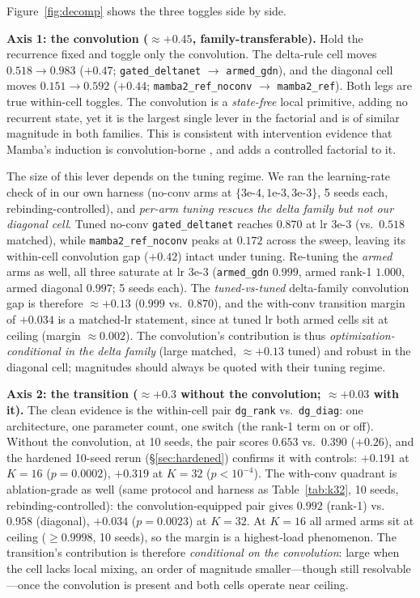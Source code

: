 \documentclass{article}
\newcommand{\armed}{\texttt{armed\_gdn}}
\newcommand{\gdn}{\texttt{gated\_deltanet}}
\newcommand{\dgrank}{\texttt{dg\_rank}}
\newcommand{\dgdiag}{\texttt{dg\_diag}}
\newcommand{\mambaref}{\texttt{mamba2\_ref}}
\newcommand{\mambanoconv}{\texttt{mamba2\_ref\_noconv}}
\begin{document}
Figure~\ref{fig:decomp} shows the three toggles side by side.

\textbf{Axis 1: the convolution ($\approx{+}0.45$, family-transferable).} Hold the recurrence fixed and toggle only the convolution. The delta-rule cell moves $0.518 \to 0.983$ ($+0.47$; \gdn{} $\to$ \armed{}), and the diagonal cell moves $0.151 \to 0.592$ ($+0.44$; \mambanoconv{} $\to$ \mambaref{}). Both legs are true within-cell toggles. The convolution is a \emph{state-free} local primitive, adding no recurrent state, yet it is the largest single lever in the factorial and is of similar magnitude in both families. This is consistent with intervention evidence that Mamba's induction is convolution-borne \citep{arora2025convs,parnichkun2025ess}, and adds a controlled factorial to it.

The size of this lever depends on the tuning regime. We ran the learning-rate check of \citet{okpekpe2025recall} in our own harness (no-conv arms at $\{3\text{e-}4, 1\text{e-}3, 3\text{e-}3\}$, 5 seeds each, rebinding-controlled), and \emph{per-arm tuning rescues the delta family but not our diagonal cell}. Tuned no-conv \gdn{} reaches $0.870$ at lr $3$e-$3$ (vs.\ $0.518$ matched), while \mambanoconv{} peaks at $0.172$ across the sweep, leaving its within-cell convolution gap (${+}0.42$) intact under tuning. Re-tuning the \emph{armed} arms as well, all three saturate at lr $3$e-$3$ (\armed{} $0.999$, armed rank-1 $1.000$, armed diagonal $0.997$; 5 seeds each). The \emph{tuned-vs-tuned} delta-family convolution gap is therefore ${\approx}{+}0.13$ ($0.999$ vs.\ $0.870$), and the with-conv transition margin of ${+}0.034$ is a matched-lr statement, since at tuned lr both armed cells sit at ceiling (margin ${\approx}0.002$). The convolution's contribution is thus \emph{optimization-conditional in the delta family} (large matched, ${\approx}{+}0.13$ tuned) and robust in the diagonal cell; magnitudes should always be quoted with their tuning regime.

\textbf{Axis 2: the transition ($\approx{+}0.3$ without the convolution; $\approx{+}0.03$ with it).} The clean evidence is the within-cell pair \dgrank{} vs.\ \dgdiag{}: one architecture, one parameter count, one switch (the rank-1 term on or off). Without the convolution, at 10 seeds, the pair scores $0.653$ vs.\ $0.390$ ($+0.26$), and the hardened 10-seed rerun (\S\ref{sec:hardened}) confirms it with controls: $+0.191$ at $K{=}16$ ($p{=}0.0002$), $+0.319$ at $K{=}32$ ($p{<}10^{-4}$). The with-conv quadrant is ablation-grade as well (same protocol and harness as Table~\ref{tab:k32}, 10 seeds, rebinding-controlled): the convolution-equipped pair gives $0.992$ (rank-1) vs.\ $0.958$ (diagonal), $+0.034$ ($p{=}0.0023$) at $K{=}32$. At $K{=}16$ all armed arms sit at ceiling ($\ge 0.9998$, 10 seeds), so the margin is a highest-load phenomenon. The transition's contribution is therefore \emph{conditional on the convolution}: large when the cell lacks local mixing, an order of magnitude smaller---though still resolvable---once the convolution is present and both cells operate near ceiling.
\end{document}
